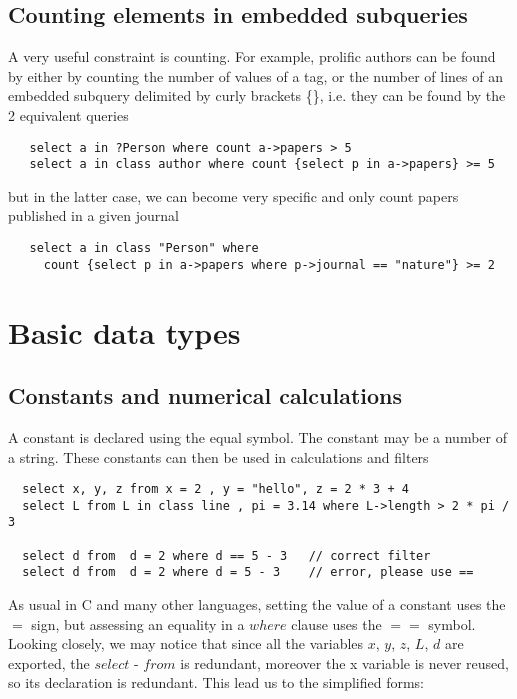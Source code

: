 \documentclass[11pt]{article}
\newcommand{\BL}{\begin{lstlisting}}
\begin{document}
%%%%%%%%%%%%%%%%%%%%%%%%%%%%%%%%%%%%%%%%%%%%%%%%%%%%%%%%%%%%%%%%
% SECTION
%%%%%%%%%%%%%%%%%%%%%%%%%%%%%%%%%%%%%%%%%%%%%%%%%%%%%%%%%%%%%%%%
\subsection{Counting elements in embedded subqueries}

A very useful constraint is counting. For example, prolific authors can be found by
either by counting the number of values of a tag, or the number of lines of an embedded 
subquery delimited by curly brackets \{\}, i.e. they can be found by the 2 equivalent queries
\BL
   select a in ?Person where count a->papers > 5
   select a in class author where count {select p in a->papers} >= 5
\end{lstlisting}
but in the latter case, we can become very specific  and only count papers published in a given journal
\BL
   select a in class "Person" where 
     count {select p in a->papers where p->journal == "nature"} >= 2
\end{lstlisting}

\section{Basic data types}
\subsection{Constants and numerical calculations}

A constant is declared using the equal symbol. The constant may be  a number of a string.
These constants can then be used in calculations and filters
\BL
  select x, y, z from x = 2 , y = "hello", z = 2 * 3 + 4
  select L from L in class line , pi = 3.14 where L->length > 2 * pi / 3

  select d from  d = 2 where d == 5 - 3   // correct filter
  select d from  d = 2 where d = 5 - 3    // error, please use == 
\end{lstlisting}
As usual in C and many other languages, setting the value of a constant 
uses the $=$ sign, but assessing an
equality in a $where$ clause uses the $==$ symbol.
Looking closely, we may notice that since all the variables $x$, $y$, $z$, $L$, $d$ 
are exported, the $select$ - $from$ is redundant, moreover the x
variable is never reused, so its declaration is redundant. This
lead us to the simplified forms:
\end{document}
